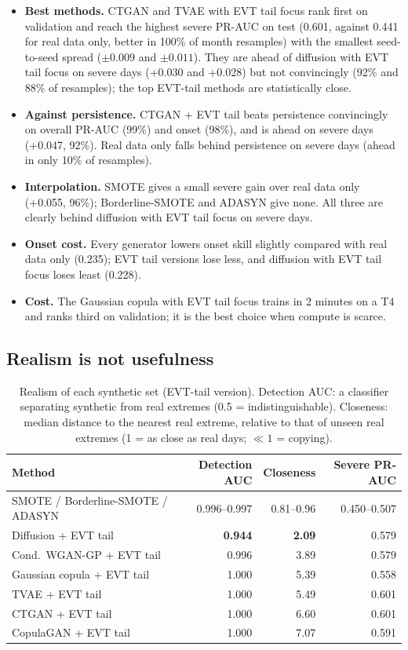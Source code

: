 \documentclass[11pt,a4paper]{article}
\begin{document}
\begin{itemize}
  \item \textbf{Best methods.} CTGAN and TVAE with EVT tail focus rank first on validation and reach the highest
        severe PR-AUC on test (0.601, against 0.441 for real data only, better in 100\% of month resamples) with
        the smallest seed-to-seed spread ($\pm0.009$ and $\pm0.011$). They are ahead of diffusion with EVT tail
        focus on severe days (+0.030 and +0.028) but not convincingly (92\% and 88\% of resamples); the top
        EVT-tail methods are statistically close.
  \item \textbf{Against persistence.} CTGAN + EVT tail beats persistence convincingly on overall PR-AUC (99\%)
        and onset (98\%), and is ahead on severe days (+0.047, 92\%). Real data only falls behind persistence on
        severe days (ahead in only 10\% of resamples).
  \item \textbf{Interpolation.} SMOTE gives a small severe gain over real data only (+0.055, 96\%); Borderline-SMOTE
        and ADASYN give none. All three are clearly behind diffusion with EVT tail focus on severe days.
  \item \textbf{Onset cost.} Every generator lowers onset skill slightly compared with real data only (0.235);
        EVT tail versions lose less, and diffusion with EVT tail focus loses least (0.228).
  \item \textbf{Cost.} The Gaussian copula with EVT tail focus trains in 2 minutes on a T4 and ranks third on
        validation; it is the best choice when compute is scarce.
\end{itemize}

\subsection{Realism is not usefulness}
\begin{table}[H]
\centering\small
\caption{Realism of each synthetic set (EVT-tail version). Detection AUC: a classifier separating synthetic from
real extremes (0.5 = indistinguishable). Closeness: median distance to the nearest real extreme, relative to
that of unseen real extremes (1 = as close as real days; $\ll1$ = copying).}\label{tab:realism}
\begin{tabular}{@{}lrrr@{}}
\toprule
Method & Detection AUC & Closeness & Severe PR-AUC\\
\midrule
SMOTE / Borderline-SMOTE / ADASYN & 0.996--0.997 & 0.81--0.96 & 0.450--0.507\\
Diffusion + EVT tail & \textbf{0.944} & \textbf{2.09} & 0.579\\
Cond.\ WGAN-GP + EVT tail & 0.996 & 3.89 & 0.579\\
Gaussian copula + EVT tail & 1.000 & 5.39 & 0.558\\
TVAE + EVT tail & 1.000 & 5.49 & 0.601\\
CTGAN + EVT tail & 1.000 & 6.60 & 0.601\\
CopulaGAN + EVT tail & 1.000 & 7.07 & 0.591\\
\bottomrule
\end{tabular}
\end{table}
\end{document}
